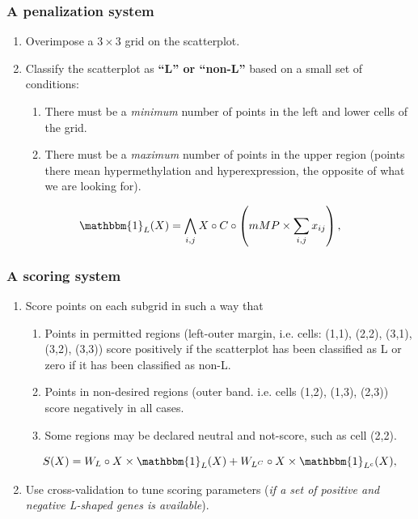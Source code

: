 \documentclass[handout]{beamer}
\begin{document}
\begin{frame}
	\frametitle{A penalization system}
	\begin{enumerate}
		\item Overimpose a $3\times 3$ grid on the scatterplot.
		\item Classify the scatterplot as \textbf{``L'' or ``non-L''} based on a small set of conditions:
		\begin{enumerate}
			\item There must be a \emph{minimum} number of points in the left and lower cells of the grid.
			\item There must be a \emph{maximum} number of points in the upper region (points there mean hypermethylation and hyperexpression, the opposite of what we are looking for).
		\end{enumerate}
	\end{enumerate}
{
\begin{equation*}
\mathbbm{1}_L(X) = \bigwedge_{i,j} X \circ C \circ \left( mMP \times \sum_{i,j}x_{ij}\right),
\end{equation*}
}

\end{frame}

\begin{frame}
	\frametitle{A scoring system}
		\begin{enumerate}
			\item Score points on each subgrid in such a way that
			\begin{enumerate}
				\item Points in permitted regions (left-outer margin, i.e. cells: (1,1), (2,2), (3,1), (3,2), (3,3)) score positively if the scatterplot has been classified as L or zero if it has been classified as non-L.
				\item Points in non-desired regions (outer band. i.e. cells (1,2), (1,3), (2,3)) score negatively in all cases.
				\item Some regions may be declared neutral and not-score, such as cell (2,2).
			\end{enumerate}
			{
			\begin{equation*}
			S(X) = W_L \circ X \times \mathbbm{1}_L(X) + W_{L^C} \circ X \times \mathbbm{1}_{L^c}(X),
			\end{equation*}
		    }
			\item Use cross-validation to tune scoring parameters (\emph{if a set of positive and negative L-shaped genes is available}).
		\end{enumerate}
	

\end{frame}
\end{document}

